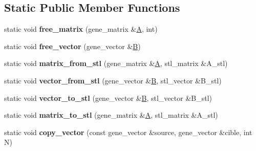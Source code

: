 \subsection*{Static Public Member Functions}
\begin{DoxyCompactItemize}
\item 
\mbox{\label{classc__interface__base_a532c91e4f11ab3f9067e7cf025c5357a}} 
static void {\bfseries free\+\_\+matrix} (gene\+\_\+matrix \&\hyperlink{group___core___module_class_eigen_1_1_matrix}{A}, int)
\item 
\mbox{\label{classc__interface__base_a06140c96a34c5d30271f7a6e1996eb85}} 
static void {\bfseries free\+\_\+vector} (gene\+\_\+vector \&\hyperlink{group___core___module_class_eigen_1_1_matrix}{B})
\item 
\mbox{\label{classc__interface__base_a9e5382709257a4a2522db1f6e66595f1}} 
static void {\bfseries matrix\+\_\+from\+\_\+stl} (gene\+\_\+matrix \&\hyperlink{group___core___module_class_eigen_1_1_matrix}{A}, stl\+\_\+matrix \&A\+\_\+stl)
\item 
\mbox{\label{classc__interface__base_a41c8375c68100638566bff514f757a0b}} 
static void {\bfseries vector\+\_\+from\+\_\+stl} (gene\+\_\+vector \&\hyperlink{group___core___module_class_eigen_1_1_matrix}{B}, stl\+\_\+vector \&B\+\_\+stl)
\item 
\mbox{\label{classc__interface__base_a6fe93f6f00b676d683d75cb9c92170e0}} 
static void {\bfseries vector\+\_\+to\+\_\+stl} (gene\+\_\+vector \&\hyperlink{group___core___module_class_eigen_1_1_matrix}{B}, stl\+\_\+vector \&B\+\_\+stl)
\item 
\mbox{\label{classc__interface__base_ad0930956d9c07cc1babd2f3f26b22e5a}} 
static void {\bfseries matrix\+\_\+to\+\_\+stl} (gene\+\_\+matrix \&\hyperlink{group___core___module_class_eigen_1_1_matrix}{A}, stl\+\_\+matrix \&A\+\_\+stl)
\item 
\mbox{\label{classc__interface__base_a6afc700b46835b233d3a10c01055a585}} 
static void {\bfseries copy\+\_\+vector} (const gene\+\_\+vector \&source, gene\+\_\+vector \&cible, int N)

\end{DoxyCompactItemize}
